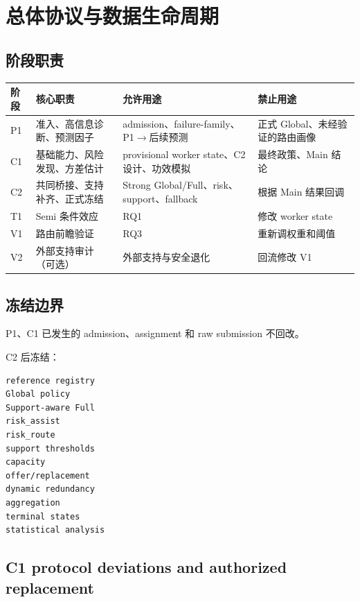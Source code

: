 \section{总体协议与数据生命周期}

\subsection{阶段职责}

\begin{longtable}{@{}p{}p{}p{}p{}@{}}
\toprule
阶段 & 核心职责 & 允许用途 & 禁止用途 \\
\midrule
\endhead
P1 & 准入、高信息诊断、预测因子 & admission、failure-family、P1$\rightarrow$后续预测 & 正式 Global、未经验证的路由画像 \\
C1 & 基础能力、风险发现、方差估计 & provisional worker state、C2 设计、功效模拟 & 最终政策、Main 结论 \\
C2 & 共同桥接、支持补齐、正式冻结 & Strong Global/Full、risk、support、fallback & 根据 Main 结果回调 \\
T1 & Semi 条件效应 & RQ1 & 修改 worker state \\
V1 & 路由前瞻验证 & RQ3 & 重新调权重和阈值 \\
V2 & 外部支持审计（可选） & 外部支持与安全退化 & 回流修改 V1 \\
\bottomrule
\end{longtable}

\subsection{冻结边界}

P1、C1 已发生的 admission、assignment 和 raw submission 不回改。

C2 后冻结：

\begin{verbatim}
reference registry
Global policy
Support-aware Full
risk_assist
risk_route
support thresholds
capacity
offer/replacement
dynamic redundancy
aggregation
terminal states
statistical analysis
\end{verbatim}

\subsection{C1 protocol deviations and authorized replacement}

